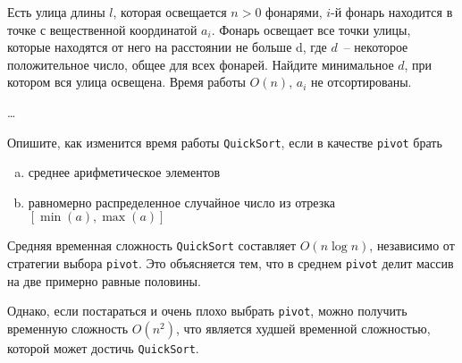 
\begin{problem}
    Есть улица длины $l$, которая освещается $n > 0$ фонарями, $i$-й фонарь находится в
    точке с вещественной координатой $a_i$. Фонарь освещает все точки улицы,
    которые находятся от него на расстоянии не больше d, где $d$~-- некоторое
    положительное число, общее для всех фонарей.
    Найдите минимальное $d$, при котором вся улица освещена. Время работы $O(n)$, $a_i$ не отсортированы.
\end{problem}

\begin{solution}
    \dots
\end{solution}


\begin{problem}
    Опишите, как изменится время работы \texttt{QuickSort}, если в качестве \texttt{pivot} брать

    \begin{enumerate}[a)]
        \item среднее арифметическое элементов
        \item равномерно распределенное случайное число из отрезка $[\min(a), \max(a)]$
    \end{enumerate}
\end{problem}

\begin{solution}
    Средняя временная сложность \texttt{QuickSort} составляет $O(n \log{n})$, независимо от стратегии выбора
    \texttt{pivot}. Это объясняется тем, что в среднем \texttt{pivot} делит массив на две примерно равные половины.

    Однако, если постараться и очень плохо выбрать \texttt{pivot}, можно получить временную сложность $O(n^2)$,
    что является худшей временной сложностью, которой может достичь \texttt{QuickSort}.
\end{solution}


